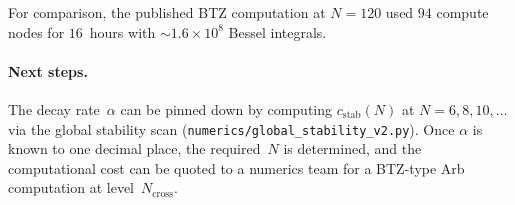 \documentclass[12pt]{article}
\theoremstyle{definition}
\theoremstyle{remark}
\begin{document}
For comparison, the published BTZ computation at $N=120$ used $94$
compute nodes for $16$~hours with $\sim 1.6\times 10^8$ Bessel
integrals.

\paragraph{Next steps.}  The decay rate~$\alpha$ can be pinned down by
computing $c_{\mathrm{stab}}(N)$ at $N=6,8,10,\ldots$ via the global
stability scan (\texttt{numerics/global\_stability\_v2.py}).  Once
$\alpha$ is known to one decimal place, the required~$N$ is determined,
and the computational cost can be quoted to a numerics team for a
BTZ-type Arb computation at level~$N_{\mathrm{cross}}$.
\end{document}
